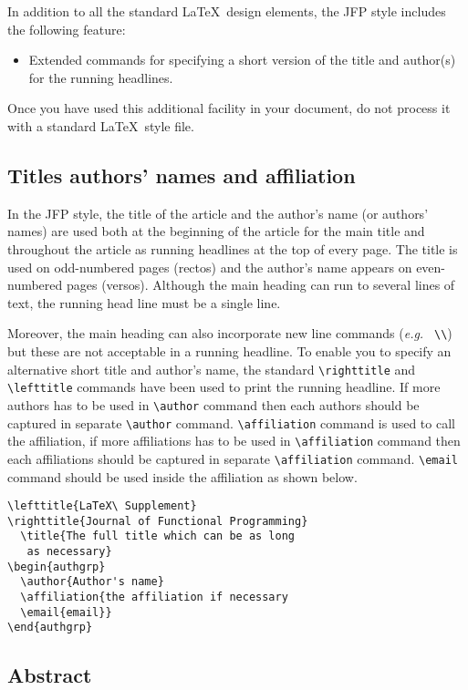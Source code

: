 \documentclass{jfp}
\begin{document}
In addition to all the standard LaTeX\ design elements, the JFP style
includes the following feature:
\begin{itemize}
  \item Extended commands for specifying a short version
        of the title and author(s) for the running
        headlines.
\end{itemize}
Once you have used this additional facility in your document,
do not process it with a standard LaTeX\ style file.

\subsection{Titles authors' names and affiliation}

In the JFP style, the title of the article and the author's name (or authors'
names) are used both at the beginning of the article for the main title and
throughout the article as running headlines at the top of every page.
The title is used on odd-numbered pages (rectos) and the author's name appears
on even-numbered pages (versos).
Although the main heading can run to several lines of text, the running head
line must be a single line.

Moreover, the main heading can also incorporate new line commands
({\it e.g.\ } \verb"\\") but these are not acceptable in a running headline.
To enable you to specify an alternative short title and author's name, the
standard \verb"\righttitle" and \verb"\lefttitle" commands have been used to print the running headline. If more authors has to be used in \verb"\author" command then each authors should be captured in separate \verb"\author" command.
\verb"\affiliation" command is used to call the affiliation, if more affiliations has to be used in \verb"\affiliation" command then each affiliations should be captured in separate \verb"\affiliation" command.
\verb"\email" command should be used inside the affiliation as shown below.
%
\begin{verbatim}
\lefttitle{LaTeX\ Supplement}
\righttitle{Journal of Functional Programming}
  \title{The full title which can be as long
   as necessary}
\begin{authgrp}
  \author{Author's name}
  \affiliation{the affiliation if necessary
  \email{email}}
\end{authgrp}
\end{verbatim}
%

\subsection{Abstract}
\end{document}
